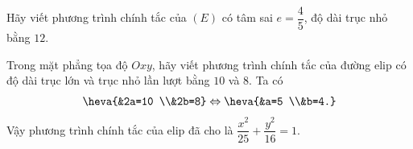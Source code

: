 \begin{vd}%
	Hãy viết phương trình chính tắc của $(E)$ có tâm sai $e=\dfrac{4}{5}$, độ dài trục nhỏ bằng $12$.
\end{vd}
\begin{vd}%
	Trong mặt phẳng tọa độ $Oxy$, hãy viết phương trình chính tắc của đường elip có độ dài trục lớn và trục nhỏ lần lượt bằng $10$ và $8$.
	\loigiai
	{
		Ta có
		\[\heva{&2a=10 \\&2b=8} \Leftrightarrow \heva{&a=5 \\&b=4.}\]
		Vậy phương trình chính tắc của elip đã cho là $\dfrac{x^2}{25}+\dfrac{y^2}{16}=1$.
	}
\end{vd}

